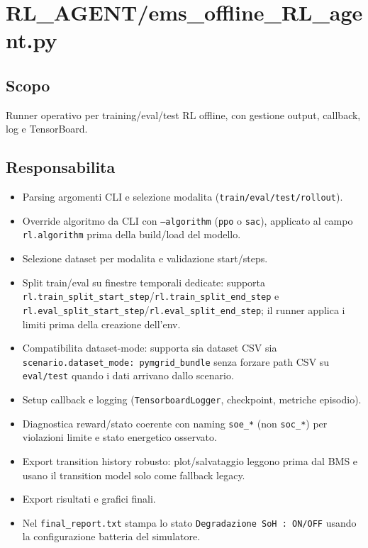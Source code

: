 ﻿\section{RL\_AGENT/ems\_offline\_RL\_agent.py}

\subsection*{Scopo}
Runner operativo per training/eval/test RL offline, con gestione output, callback, log e TensorBoard.

\subsection*{Responsabilita}
\begin{itemize}[leftmargin=1.2cm]
\item Parsing argomenti CLI e selezione modalita (\texttt{train/eval/test/rollout}).
\item Override algoritmo da CLI con \texttt{--algorithm} (\texttt{ppo} o \texttt{sac}),
  applicato al campo \texttt{rl.algorithm} prima della build/load del modello.
\item Selezione dataset per modalita e validazione start/steps.
\item Split train/eval su finestre temporali dedicate:
  supporta \texttt{rl.train\_split\_start\_step}/\texttt{rl.train\_split\_end\_step} e
  \texttt{rl.eval\_split\_start\_step}/\texttt{rl.eval\_split\_end\_step}; il runner
  applica i limiti prima della creazione dell'env.
\item Compatibilita dataset-mode: supporta sia dataset CSV sia
  \texttt{scenario.dataset\_mode: pymgrid\_bundle} senza forzare path CSV su \texttt{eval/test}
  quando i dati arrivano dallo scenario.
\item Setup callback e logging (\texttt{TensorboardLogger}, checkpoint, metriche episodio).
\item Diagnostica reward/stato coerente con naming \texttt{soe\_*} (non \texttt{soc\_*})
  per violazioni limite e stato energetico osservato.
\item Export transition history robusto: plot/salvataggio leggono prima dal BMS e
  usano il transition model solo come fallback legacy.
\item Export risultati e grafici finali.
\item Nel \texttt{final\_report.txt} stampa lo stato \texttt{Degradazione SoH : ON/OFF}
  usando la configurazione batteria del simulatore.
\end{itemize}

